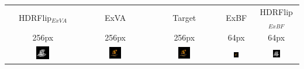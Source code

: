 
\begingroup
\begin{table}[!htb]
    \centering
    \setlength\tabcolsep{2pt}
    \begin{tabular*}{\textwidth}{ c c c c c }
        HDRFlip$_{ExVA}$ & ExVA & Target & ExBF & HDRFlip$_{ExBF}$ \\
        256px & 256px & 256px & 64px & 64px \\
        
          \includegraphics[width=0.19\textwidth]{figures/results/arb_set/validation/lego6_exva_hdrflip_150k.png}
        & \includegraphics[width=0.19\textwidth]{figures/results/arb_set/validation/lego6_exva_150k.png}
        & \includegraphics[width=0.19\textwidth]{figures/results/arb_set/validation/lego6_targ_256px.png}
        & \includegraphics[width=0.19\textwidth]{figures/results/arb_set/validation/lego6_exbf_112k.png}
        & \includegraphics[width=0.19\textwidth]{figures/results/arb_set/validation/lego6_exbf_hdrflip_112k.png} \\[-6pt]
        

\end{tabular*}
\end{table}
